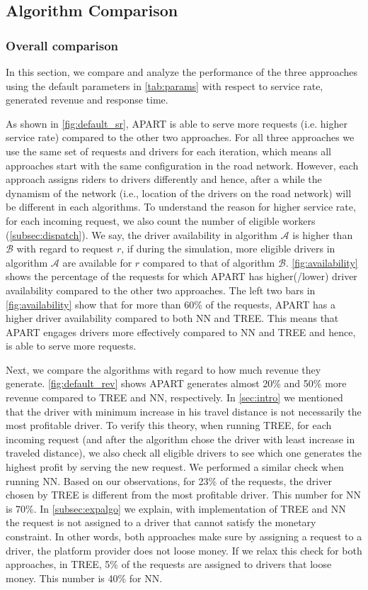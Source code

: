 \subsection{Algorithm Comparison}

\subsubsection{Overall comparison}
In this section, we compare and analyze the performance of the three approaches using the default parameters in \cref{tab:params} with respect to service rate, generated revenue and response time.

As shown in \cref{fig:default_sr}, APART is able to serve more requests (i.e. higher service rate) compared to the other two approaches. For all three approaches we use the same set of requests and drivers for each iteration, which means all approaches start with the same configuration in the road network. However, each approach assigns riders to drivers differently and hence, after a while the dynamism of the network (i.e., location of the drivers on the road network) will be different in each algorithms. To understand the reason for higher service rate, for each incoming request, we also count the number of eligible workers (\cref{subsec:dispatch}). We say, the driver availability in algorithm $\mathcal{A}$ is higher than $\mathcal{B}$ with regard to request $r$, if during the simulation, more eligible drivers in algorithm $\mathcal{A}$ are available for $r$ compared to that of algorithm $\mathcal{B}$. \cref{fig:availability} shows the percentage of the requests for which APART has higher(/lower) driver availability compared to the other two approaches. The left two bars in \cref{fig:availability} show that for more than 60\% of the requests, APART has a higher driver availability compared to both NN and TREE. This means that APART engages drivers more effectively compared to NN and TREE and hence, is able to serve more requests.

Next, we compare the algorithms with regard to how much revenue they generate. \cref{fig:default_rev} shows APART generates almost 20\% and 50\% more revenue compared to TREE and NN, respectively. In \cref{sec:intro} we mentioned that the driver with minimum increase in his travel distance is not necessarily the most profitable driver. To verify this theory, when running TREE, for each incoming request (and after the algorithm chose the driver with least increase in traveled distance), we also check all eligible drivers to see which one generates the highest profit by serving the new request. We performed a similar check when running NN. Based on our observations, for 23\% of the requests, the driver chosen by TREE is different from the most profitable driver. This number for NN is 70\%. In \cref{subsec:expalgo} we explain, with implementation of TREE and NN the request is not assigned to a driver that cannot satisfy the monetary constraint. In other words, both approaches make sure by assigning a request to a driver, the platform provider does not loose money. If we relax this check for both approaches, in TREE, 5\% of the requests are assigned to drivers that loose money. This number is 40\% for NN.


